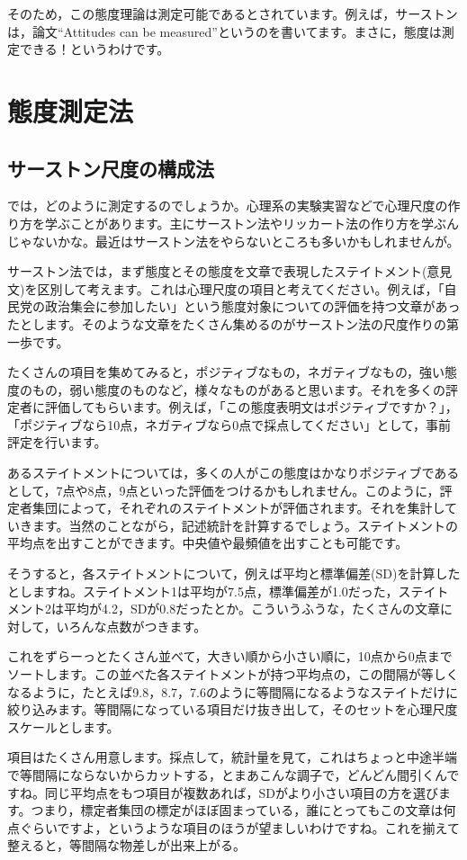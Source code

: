 \documentclass{ltjsbook}
\begin{document}
そのため，この態度理論は測定可能であるとされています。例えば，サーストンは，論文``Attitudes can be measured''というのを書いてます\parencite{ACBM}。まさに，態度は測定できる！というわけです。

\section{態度測定法}
\subsection{サーストン尺度の構成法}
では，どのように測定するのでしょうか。心理系の実験実習などで心理尺度の作り方を学ぶことがあります。主にサーストン法やリッカート法の作り方を学ぶんじゃないかな。最近はサーストン法をやらないところも多いかもしれませんが。

サーストン法では，まず態度とその態度を文章で表現したステイトメント(意見文)を区別して考えます。これは心理尺度の項目と考えてください。例えば，「自民党の政治集会に参加したい」という態度対象についての評価を持つ文章があったとします。そのような文章をたくさん集めるのがサーストン法の尺度作りの第一歩です。

たくさんの項目を集めてみると，ポジティブなもの，ネガティブなもの，強い態度のもの，弱い態度のものなど，様々なものがあると思います。それを多くの評定者に評価してもらいます。例えば，「この態度表明文はポジティブですか？」，「ポジティブなら10点，ネガティブなら0点で採点してください」として，事前評定を行います。

あるステイトメントについては，多くの人がこの態度はかなりポジティブであるとして，7点や8点，9点といった評価をつけるかもしれません。このように，評定者集団によって，それぞれのステイトメントが評価されます。それを集計していきます。当然のことながら，記述統計を計算するでしょう。ステイトメントの平均点を出すことができます。中央値や最頻値を出すことも可能です。

そうすると，各ステイトメントについて，例えば平均と標準偏差(SD)を計算したとしますね。ステイトメント1は平均が7.5点，標準偏差が1.0だった，ステイトメント2は平均が4.2，SDが0.8だったとか。こういうふうな，たくさんの文章に対して，いろんな点数がつきます。

これをずらーっとたくさん並べて，大きい順から小さい順に，10点から0点までソートします。この並べた各ステイトメントが持つ平均点の，この間隔が等しくなるように，たとえば9.8，8.7，7.6のように等間隔になるようなステイトだけに絞り込みます。等間隔になっている項目だけ抜き出して，そのセットを心理尺度スケールとします。

項目はたくさん用意します。採点して，統計量を見て，これはちょっと中途半端で等間隔にならないからカットする，とまあこんな調子で，どんどん間引くんですね。同じ平均点をもつ項目が複数あれば，SDがより小さい項目の方を選びます。つまり，標定者集団の標定がほぼ固まっている，誰にとってもこの文章は何点ぐらいですよ，というような項目のほうが望ましいわけですね。これを揃えて整えると，等間隔な物差しが出来上がる。
\end{document}
